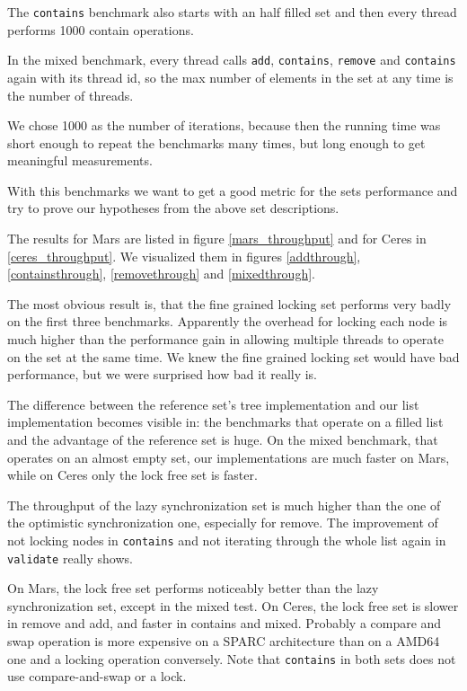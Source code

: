 The \texttt{contains} benchmark also starts with an half filled set and then every thread performs 1000 contain operations.

In the mixed benchmark, every thread calls \texttt{add}, \texttt{contains}, \texttt{remove} and \texttt{contains} again with its thread id, so the max number of elements in the set at any time is the number of threads.


We chose 1000 as the number of iterations, because then the running time was short enough to repeat the benchmarks many times, but long enough to get meaningful measurements.


With this benchmarks we want to get a good metric for the sets performance and try to prove our hypotheses from the above set descriptions.

The results for Mars are listed in figure \ref{mars_throughput} and for Ceres in \ref{ceres_throughput}. We visualized them in figures \ref{addthrough}, \ref{containsthrough}, \ref{removethrough} and \ref{mixedthrough}.


The most obvious result is, that the fine grained locking set performs very badly on the first three benchmarks. Apparently the overhead for locking each node is much higher than the performance gain in allowing multiple threads to operate on the set at the same time. We knew the fine grained locking set would have bad performance, but we were surprised how bad it really is.

The difference between the reference set's tree implementation and our list implementation becomes visible in: the benchmarks that operate on a filled list and the advantage of the reference set is huge. On the mixed benchmark, that operates on an almost empty set, our implementations are much faster on Mars, while on Ceres only the lock free set is faster.

The throughput of the lazy synchronization set is much higher than the one of the optimistic synchronization one, especially for remove. The improvement of not locking nodes in \texttt{contains} and not iterating through the whole list again in \texttt{validate} really shows.


On Mars, the lock free set performs noticeably better than the lazy synchronization set, except in the mixed test. On Ceres, the lock free set is slower in remove and add, and faster in contains and mixed. 
Probably a compare and swap operation is more expensive on a SPARC architecture than on a AMD64 one and a locking operation conversely. Note that \texttt{contains} in both sets does not use compare-and-swap or a lock.


